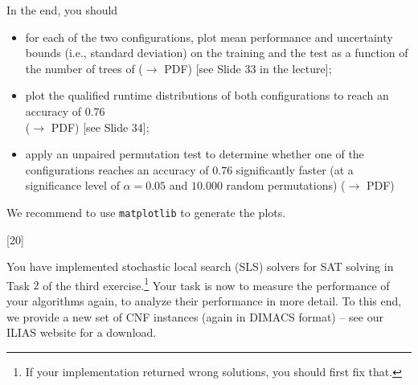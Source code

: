 \documentclass{exam}
\begin{document}
\begin{questions}
In the end, you should

\begin{itemize} 
  \item for each of the two configurations, plot mean performance and uncertainty bounds (i.e., standard deviation) on the training and the test as a function of the number of trees of ($\to$ PDF) [see Slide 33 in the lecture];
  \item plot the qualified runtime distributions of both configurations to reach an accuracy of $0.76$\\ ($\to$ PDF) [see Slide 34];
  \item apply an unpaired permutation test to determine whether one of the configurations reaches an accuracy of $0.76$ significantly faster (at a significance level of $\alpha=0.05$ and $10.000$ random permutations) ($\to$ PDF)
\end{itemize}

We recommend to use \texttt{matplotlib} to generate the plots.


[20]

You have implemented stochastic local search (SLS) solvers for SAT solving in Task $2$ of the third exercise.\footnote{If your implementation returned wrong solutions, you should first fix that.}
Your task is now to measure the performance of your algorithms again, to analyze their performance in more detail.
To this end, we provide a new set of CNF instances (again in DIMACS format) -- see our ILIAS website for a download.


\end{questions}
\end{document}
